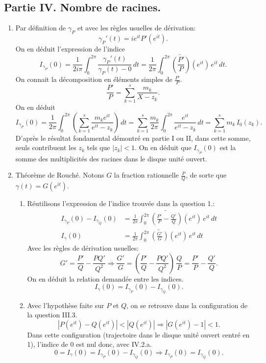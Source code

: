 \subsection*{Partie IV. Nombre de racines.}
\begin{enumerate}
 \item Par définition de $\gamma_P$ et avec les règles usuelles de dérivation:
\[
 {\gamma_P}'(t) = ie^{it}P'(e^{it}).
\]
On en déduit l'expression de l'indice
\[
 I_{\gamma_P}(0) = \frac{1}{2i\pi}\int_{0}^{2\pi}\frac{{\gamma_P}'(t)}{{\gamma_P}(t) - 0}\, dt
 = \frac{1}{2\pi}\int_{0}^{2\pi}\widetilde{\left( \frac{P'}{P}\right)}(e^{it})\, e^{it}\, dt. 
\]
On connait la décomposition en éléments simples de $\frac{P'}{P}$.
\[
 \frac{P'}{P} = \sum_{k=1}^{s}\frac{m_k}{X - z_k}.
\]
On en déduit
\[
 I_{\gamma_P}(0) = \frac{1}{2\pi}\int_{0}^{2\pi}\left( \sum_{k=1}^{s}\frac{m_k e^{it}}{e^{it} - z_k}\right)\, dt
 = \sum_{k=1}^{s} \frac{m_k}{2\pi}\int_{0}^{2\pi}\frac{e^{it}}{e^{it} - z_k}\, dt
 = \sum_{k=1}^{s} m_k\,I_0(z_k).
\]
D'après le résultat fondamental démontré en partie I ou II, dans cette somme, seuls contribuent les $z_k$ tels que $|z_k| < 1$. On en déduit que $I_{\gamma_P}(0)$ est la somme des multiplicités des racines dans le disque unité ouvert.

 \item Théorème de Rouché. Notons $G$ la fraction rationnelle $\frac{P}{Q}$, de sorte que $\gamma(t) = G(e^{it})$.
\begin{enumerate}
 \item Réutilisons l'expression de l'indice trouvée dans la question 1.:
\begin{align*}
 I_{\gamma_P}(0) - I_{\gamma_Q}(0) &=
 \frac{1}{2\pi}\int_{0}^{2\pi}\widetilde{\left( \frac{P'}{P}- \frac{Q'}{Q}\right)}(e^{it})\, e^{it}\, dt \\
 I_\gamma(0) &= \frac{1}{2\pi}\int_{0}^{2\pi}\widetilde{\left( \frac{G'}{G}\right)}(e^{it})\, e^{it}\, dt 
\end{align*}
Avec les règles de dérivation usuelles:
\[
 G' = \frac{P'}{Q} - \frac{PQ'}{Q^2} \Rightarrow
 \frac{G'}{G} = \left( \frac{P'}{Q} - \frac{PQ'}{Q^2}\right) \, \frac{Q}{P}
 = \frac{P'}{P} - \frac{Q'}{Q}. 
\]
On en déduit la relation demandée entre les indices.
\[
 I_\gamma(0) = I_{\gamma_P}(0) - I_{\gamma_Q}(0).
\]
 \item Avec l'hypothèse faite sur $P$ et $Q$, on se retrouve dans la configuration de la question III.3.
\[
 \left|P(e^{it}) - Q(e^{it})\right| < \left| Q(e^{it}) \right|
 \Rightarrow
 \left|G(e^{it}) - 1 \right| < 1.
\]
Dans cette configuration (trajectoire dans le disque unité ouvert centré en 1), l'indice de 0 est nul donc, avec IV.2.a.
\[
 0 = I_\gamma(0) = I_{\gamma_P}(0) - I_{\gamma_Q}(0) \Rightarrow I_{\gamma_P}(0) = I_{\gamma_Q}(0).
\]


\end{enumerate}
\end{enumerate}
